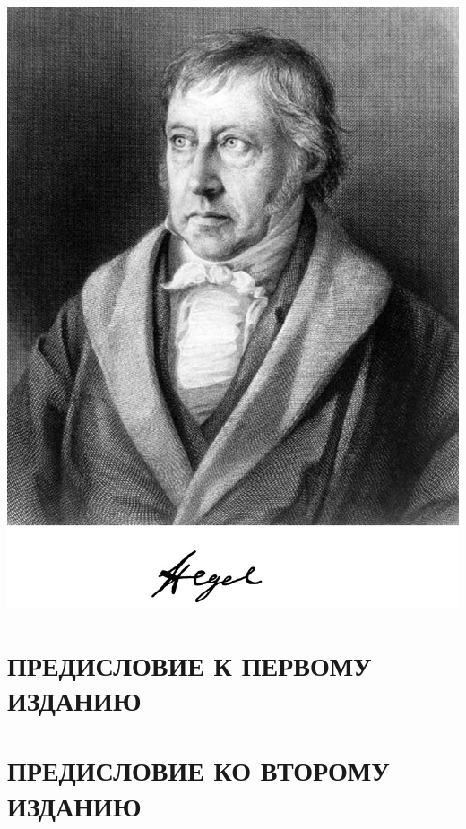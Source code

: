\documentclass[b5paper, 11pt, twoside, onecolumn, openany]{memoir}
\begin{document}
\begin{center}
\includegraphics[width=14cm]{hegel-img001.png}
\end{center}

\restoregeometry

\mainmatter

\pagestyle{plain}

\section[Предисловие к первому изданию]{\large ПРЕДИСЛОВИЕ К ПЕРВОМУ ИЗДАНИЮ}
\thispagestyle{empty}


\section[Предисловие ко второму изданию]{\large ПРЕДИСЛОВИЕ КО ВТОРОМУ ИЗДАНИЮ}
\thispagestyle{empty}

\end{document}
